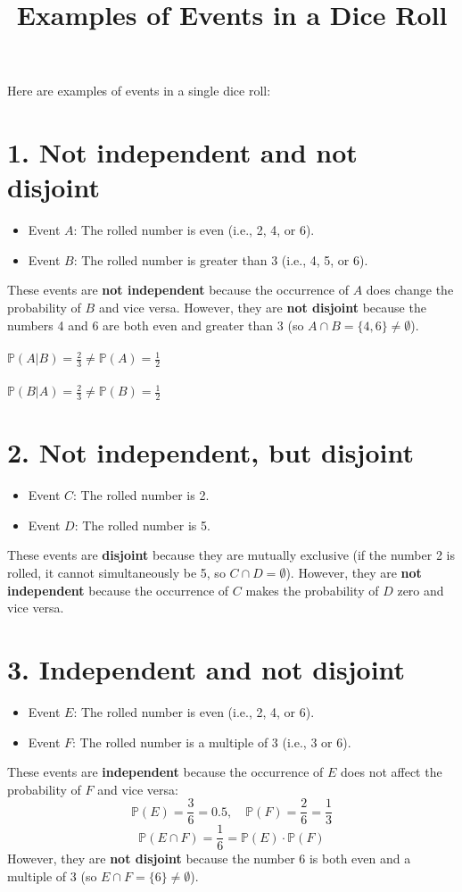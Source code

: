 \documentclass{article}
\title{Examples of Events in a Dice Roll}
\author{}
\date{}
\begin{document}
\maketitle

Here are examples of events in a single dice roll:

\section*{1. Not independent and not disjoint}
\begin{itemize}
    \item Event $A$: The rolled number is even (i.e., 2, 4, or 6).
    \item Event $B$: The rolled number is greater than 3 (i.e., 4, 5, or 6).
\end{itemize}
These events are \textbf{not independent} because the occurrence of $A$ does change the probability of $B$ and vice versa. However, they are \textbf{not disjoint} because the numbers 4 and 6 are both even and greater than 3 (so $A \cap B = \{ 4,6 \} \neq \emptyset$).\\
\\
$\mathbb{P}(A|B) = \frac{2}{3} \ne \mathbb{P}(A) = \frac{1}{2}$\\
\\
$\mathbb{P}(B|A) = \frac{2}{3} \ne \mathbb{P}(B) = \frac{1}{2}$

\section*{2. Not independent, but disjoint}
\begin{itemize}
    \item Event $C$: The rolled number is 2.
    \item Event $D$: The rolled number is 5.
\end{itemize}
These events are \textbf{disjoint} because they are mutually exclusive (if the number 2 is rolled, it cannot simultaneously be 5, so $C \cap D = \emptyset$). However, they are \textbf{not independent} because the occurrence of $C$ makes the probability of $D$ zero and vice versa.

\section*{3. Independent and not disjoint}
\begin{itemize}
    \item Event $E$: The rolled number is even (i.e., 2, 4, or 6).
    \item Event $F$: The rolled number is a multiple of 3 (i.e., 3 or 6).
\end{itemize}
These events are \textbf{independent} because the occurrence of $E$ does not affect the probability of $F$ and vice versa:
\[
\mathbb{P}(E) = \frac{3}{6} = 0.5, \quad \mathbb{P}(F) = \frac{2}{6} = \frac{1}{3}
\]
\[
\mathbb{P}(E \cap F) = \frac{1}{6} = \mathbb{P}(E) \cdot \mathbb{P}(F)
\]
However, they are \textbf{not disjoint} because the number 6 is both even and a multiple of 3 (so $E \cap F = \{ 6 \} \neq \emptyset$).
\end{document}
